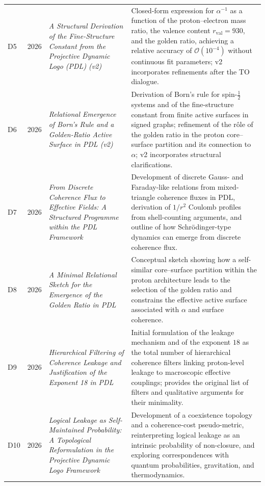 \documentclass{article}
\begin{document}
\begin{longtable}{@{}llL{4cm}p{9.5cm}@{}}
D5 & 2026 & \textit{A Structural Derivation of the Fine-Structure Constant from the Projective Dynamic Logo (PDL) (v2)} &
Closed-form expression for $\alpha^{-1}$ as a function of the proton–electron mass ratio, the valence content $r_{\mathrm{val}}=930$, and the golden ratio, achieving a relative accuracy of $\mathcal{O}(10^{-4})$ without continuous fit parameters; v2 incorporates refinements after the TO dialogue. \citep{Alpha_PDL_v2_2026} \\[0.5em]

D6 & 2026 & \textit{Relational Emergence of Born's Rule and a Golden-Ratio Active Surface in PDL (v2)} &
Derivation of Born's rule for spin-$\tfrac{1}{2}$ systems and of the fine-structure constant from finite active surfaces in signed graphs; refinement of the rôle of the golden ratio in the proton core–surface partition and its connection to $\alpha$; v2 incorporates structural clarifications. \citep{Born_Golden_v2_2026,Golden_Ratio_Sketch_2026} \\[0.5em]

D7 & 2026 & \textit{From Discrete Coherence Flux to Effective Fields: A Structured Programme within the PDL Framework} &
Development of discrete Gauss- and Faraday-like relations from mixed-triangle coherence fluxes in PDL, derivation of $1/r^2$ Coulomb profiles from shell-counting arguments, and outline of how Schr\"odinger-type dynamics can emerge from discrete coherence flux. \citep{Effective_Fields_PDL_2026} \\[0.5em]

D8 & 2026 & \textit{A Minimal Relational Sketch for the Emergence of the Golden Ratio in PDL} &
Conceptual sketch showing how a self-similar core–surface partition within the proton architecture leads to the selection of the golden ratio and constrains the effective active surface associated with $\alpha$ and surface coherence. \citep{Golden_Ratio_Sketch_2026} \\[0.5em]

D9 & 2026 & \textit{Hierarchical Filtering of Coherence Leakage and Justification of the Exponent 18 in PDL} &
Initial formulation of the leakage mechanism and of the exponent $18$ as the total number of hierarchical coherence filters linking proton-level leakage to macroscopic effective couplings; provides the original list of filters and qualitative arguments for their minimality. \citep{Exponent_18_PDL_2026} \\[0.5em]

D10 & 2026 & \textit{Logical Leakage as Self-Maintained Probability: A Topological Reformulation in the Projective Dynamic Logo Framework} &
Development of a coexistence topology and a coherence-cost pseudo-metric, reinterpreting logical leakage as an intrinsic probability of non-closure, and exploring correspondences with quantum probabilities, gravitation, and thermodynamics. \citep{Topological_Reformulation_PDL_2026} \\[0.5em]


\end{longtable}
\end{document}
